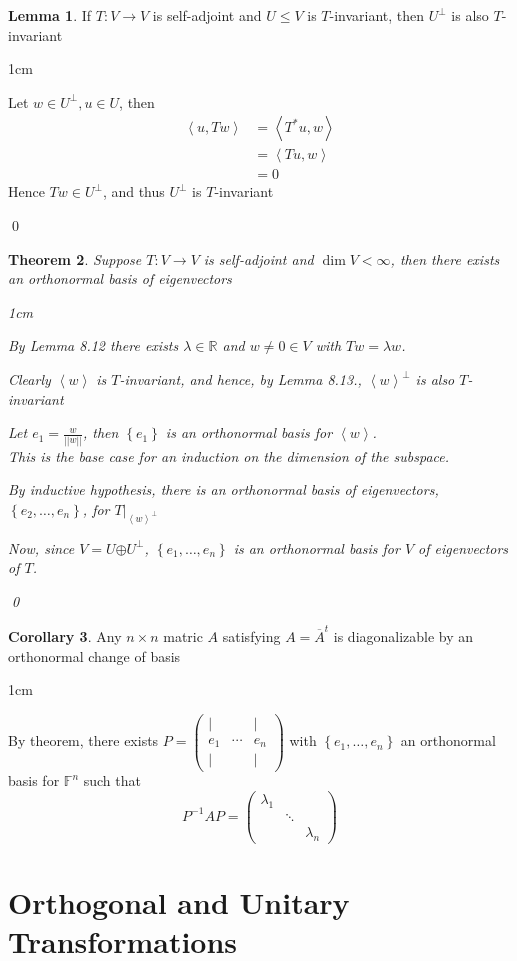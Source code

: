\documentclass[11pt, a4paper]{report}
\makeatletter
\numberwithin{equation}{section}
\newcommand{\opl}{\boldsymbol{\oplus}}
\newcommand{\R}{\mathbb{R}}
\newcommand{\F}{\mathbb{F}}
\newcommand{\spn}[1]{\left\langle #1 \right\rangle}
\newcommand{\sett}[1]{\left\lbrace #1 \right\rbrace}
\newcommand{\pmx}[1]{\begin{pmatrix}#1\end{pmatrix}}
\numberwithin{equation}{subsection}
\theoremstyle{plain}
\newtheorem{thm}{Theorem}[chapter] %
\theoremstyle{definition}
\newtheorem{lem}[thm]{Lemma}
\newtheorem{cor}[thm]{Corollary}
\theoremstyle{remark}
\newtheorem*{prf}{Proof}
\renewenvironment{prf}[1][\proofname]{\par
  \vspace{-\topsep}%
  \normalfont
  \topsep0pt \partopsep0pt %
  \trivlist
  \item[\hskip\labelsep
        \itshape
    #1\@addpunct{.}]\ignorespaces
}{%
  \popQED\endtrivlist\@endpefalse
  \addvspace{6pt plus 6pt} %
}
\newcommand{\pr}[1]{\begin{adjustwidth}{1cm}{} \begin{prf} #1 \end{prf} \end{adjustwidth}}
\makeatother
\begin{document}
\begin{lem}
If $T: V \to V$ is self-adjoint and $U \leq V$ is $T$-invariant, then $U^\perp$ is also $T$-invariant
\pr{Let $w \in U^\perp, u \in U$, then
\begin{align*}
\spn{u, Tw}	&= \spn{T^*u, w} \tag{definition of adjoint}\\
			&= \spn{Tu, w} \tag{$T$ self-adjoint}\\
			&= 0 \tag{$Tu \in U, w \in U^\perp$}
\end{align*}
Hence $Tw \in U^\perp$, and thus $U^\perp$ is $T$-invariant
}\qed
\end{lem}

\newpage

\begin{thm}
Suppose $T: V \to V$ is self-adjoint and $\dim V < \infty$, then there exists an orthonormal basis of eigenvectors
\pr{
By Lemma 8.12 there exists $\lambda \in \R$ and $w \neq 0 \in V$ with $Tw = \lambda w$.

Clearly $\spn{w}$ is $T$-invariant, and hence, by Lemma 8.13., $\spn{w}^\perp$ is also $T$-invariant

Let $e_1 = \frac{w}{||w||}$, then $\sett{e_1}$ is an orthonormal basis for $\spn{w}$.\\ This is the base case for an induction on the dimension of the subspace.

By inductive hypothesis, there is an orthonormal basis of eigenvectors, $\sett{e_2, \ldots, e_n}$, for $T|_{\spn{w}^\perp}$

Now, since $V = U \opl U^\perp$, $\sett{e_1, \ldots, e_n}$ is an orthonormal basis for $V$ of eigenvectors of $T$.
}\qed
\end{thm}

\begin{cor}
Any $n \times n$ matric $A$ satisfying $A = \overline{A}^t$ is diagonalizable by an orthonormal change of basis
\pr{
By theorem, there exists $P = \pmx{| & & |\\e_1 & \cdots & e_n\\| & & |}$ with $\sett{e_1, \ldots, e_n}$ an orthonormal basis for $\F^n$ such that\\
$$P^{-1}AP = \pmx{\lambda_1\\ & \ddots\\ && \lambda_n}$$
}
\end{cor}

\section{Orthogonal and Unitary Transformations}
\end{document}
